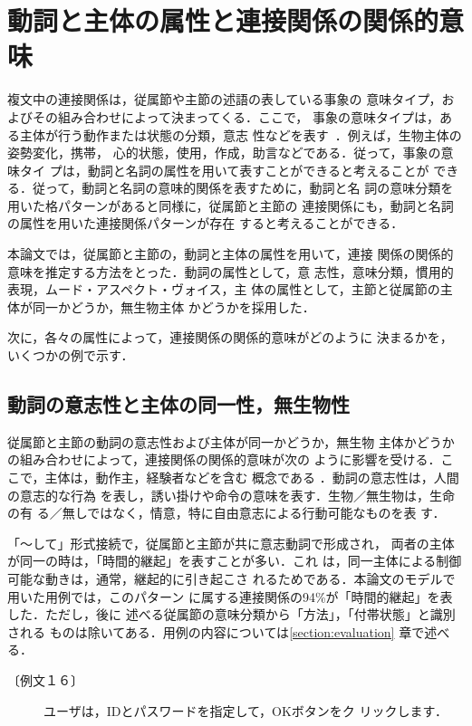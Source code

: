 \section{動詞と主体の属性と連接関係の関係的意味}
複文中の連接関係は，従属節や主節の述語の表している事象の
意味タイプ，およびその組み合わせによって決まってくる．ここで，
事象の意味タイプは，ある主体が行う動作または状態の分類，意志
性などを表す~\cite{Jinta1995}．例えば，生物主体の姿勢変化，携帯，
心的状態，使用，作成，助言などである．従って，事象の意味タイ
プは，動詞と名詞の属性を用いて表すことができると考えることが
できる．従って，動詞と名詞の意味的関係を表すために，動詞と名
詞の意味分類を用いた格パターンがあると同様に，従属節と主節の
連接関係にも，動詞と名詞の属性を用いた連接関係パターンが存在
すると考えることができる．

本論文では，従属節と主節の，動詞と主体の属性を用いて，連接
関係の関係的意味を推定する方法をとった．動詞の属性として，意
志性，意味分類，慣用的表現，ムード・アスペクト・ヴォイス，主
体の属性として，主節と従属節の主体が同一かどうか，無生物主体
かどうかを採用した．

次に，各々の属性によって，連接関係の関係的意味がどのように
決まるかを，いくつかの例で示す．

\subsection{動詞の意志性と主体の同一性，無生物性}
従属節と主節の動詞の意志性および主体が同一かどうか，無生物
主体かどうかの組み合わせによって，連接関係の関係的意味が次の
ように影響を受ける．ここで，主体は，動作主，経験者などを含む
概念である\cite{Jinta1995} ．動詞の意志性は，人間の意志的な行為
を表し，誘い掛けや命令の意味を表す．生物／無生物は，生命の有
る／無しではなく，情意，特に自由意志による行動可能なものを表
す．

「〜して」形式接続で，従属節と主節が共に意志動詞で形成され，
両者の主体が同一の時は，「時間的継起」を表すことが多い．これ
は，同一主体による制御可能な動きは，通常，継起的に引き起こさ
れるためである．本論文のモデルで用いた用例では，このパターン
に属する連接関係の94\%が「時間的継起」を表した．ただし，後に
述べる従属節の意味分類から「方法」，「付帯状態」と識別される
ものは除いてある．用例の内容については\ref{section:evaluation} 章で述べる．
\begin{description}
\item[〔例文１６〕] ユーザは，IDとパスワードを指定して，OKボタンをク
リックします．
\end{description}

